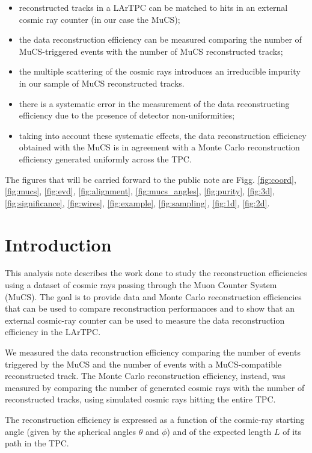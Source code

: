 \documentclass[a4paper]{scrartcl}
\begin{document}
\begin{itemize}
  \item reconstructed tracks in a LArTPC can be matched to hits in an external cosmic ray counter (in our case the MuCS);
  \item the data reconstruction efficiency can be measured comparing the number of MuCS-triggered events with the number of MuCS reconstructed tracks;
  \item the multiple scattering of the cosmic rays introduces an irreducible impurity in our sample of MuCS reconstructed tracks.
  \item there is a systematic error in the measurement of the data reconstructing efficiency due to the presence of detector non-uniformities;
  \item taking into account these systematic effects, the data reconstruction efficiency obtained with the MuCS is in agreement with a Monte Carlo reconstruction efficiency generated uniformly across the TPC.

\end{itemize}

The figures that will be carried forward to the public note are Figg. \ref{fig:coord}, \ref{fig:mucs}, \ref{fig:evd}, \ref{fig:alignment}, \ref{fig:mucs_angles}, \ref{fig:purity}, \ref{fig:3d}, \ref{fig:significance}, \ref{fig:wires}, \ref{fig:example}, \ref{fig:sampling}, \ref{fig:1d}, \ref{fig:2d}.
\clearpage{}
\section{Introduction}
This analysis note describes the work done to study the reconstruction efficiencies using a dataset of cosmic rays passing through the Muon Counter System (MuCS).
The goal is to provide data and Monte Carlo reconstruction efficiencies that can be used to compare reconstruction performances and to show that an external cosmic-ray counter can be used to measure the data reconstruction efficiency in the LArTPC.

We measured the data reconstruction efficiency comparing the number of events triggered by the MuCS and the number of events with a MuCS-compatible reconstructed track.
The Monte Carlo reconstruction efficiency, instead, was measured by comparing the number of generated cosmic rays with the number of reconstructed tracks, using simulated cosmic rays hitting the entire TPC.

The reconstruction efficiency is expressed as a function of the cosmic-ray starting angle (given by the spherical angles $\theta$ and $\phi$) and of the expected length $L$ of its path in the TPC.%
\end{document}

